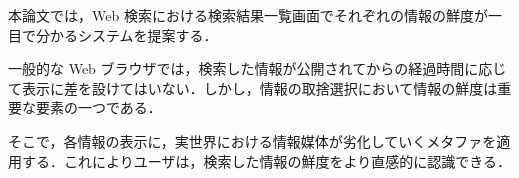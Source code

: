 

\begin{jabstract}

本論文では，Web 検索における検索結果一覧画面でそれぞれの情報の鮮度が一目で分かるシステムを提案する．

一般的な Web ブラウザでは，検索した情報が公開されてからの経過時間に応じて表示に差を設けてはいない．しかし，情報の取捨選択において情報の鮮度は重要な要素の一つである．

そこで，各情報の表示に，実世界における情報媒体が劣化していくメタファを適用する．これによりユーザは，検索した情報の鮮度をより直感的に認識できる．

\end{jabstract}
